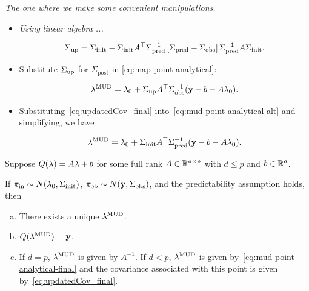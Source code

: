 \begin{frame}[t]{\it The one where we make some convenient manipulations.}
\begin{itemize}
  \item \emph{Using linear algebra ...}

  \begin{equation}\label{eq:updatedCov_final}
  	\Sigma_\text{up} = \Sigma_\text{init} - \Sigma_\text{init} A^\top \Sigma_\text{pred}^{-1}\left[\Sigma_\text{pred}-\Sigma_\text{obs}\right]\Sigma_\text{pred}^{-1}A\Sigma_\text{init}.
  \end{equation}

  \bigskip
  \bigskip
  \item Substitute $\Sigma_\text{up}$ for $\Sigma_\text{post}$ in \eqref{eq:map-point-analytical}:

  \begin{equation}\label{eq:mud-point-analytical-alt}
  \lambda^{\text{MUD}} = \lambda_0 + \Sigma_\text{up} A^\top \Sigma_\text{obs}^{-1} (\mathbf{y} - b - A\lambda_0).
  \end{equation}

  \bigskip
  \bigskip
  \item Substituting~\eqref{eq:updatedCov_final} into~\eqref{eq:mud-point-analytical-alt} and simplifying, we have

  \begin{equation}\label{eq:mud-point-analytical-final}
  	\lambda^{\text{MUD}} = \lambda_0 + \Sigma_\text{init} A^\top \Sigma_\text{pred}^{-1}(\mathbf{y} - b - A\lambda_0).
  \end{equation}

\end{itemize}

\end{frame}

\begin{frame}

\begin{thm}\label{thm:MUD_existence_uniqueness}

Suppose  $Q(\lambda)=A\lambda+b$ for some full rank $A\in\mathbb{R}^{d\times p}$ with $d\leq p$ and $b\in\mathbb{R}^d$.

If $\operatorname*{\pi_{in}} \sim N(\lambda_0,\Sigma_\text{init})$, $\operatorname*{\pi_{ob}}\sim N(\mathbf{y},\Sigma_\text{obs})$, and the predictability assumption holds, then

\begin{enumerate}[(a)]
  \item There exists a unique $\lambda^{\text{MUD}}$.
  \item $Q(\lambda^{\text{MUD}}) = \mathbf{y}$.
  \item If $d=p$, $\lambda^{\text{MUD}}$ is given by $A^{-1}$. If $d<p$, $\lambda^{\text{MUD}}$ is given by~\eqref{eq:mud-point-analytical-final} and the covariance associated with this point is given by~\eqref{eq:updatedCov_final}.
\end{enumerate}
\end{thm}

\end{frame}

